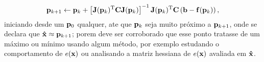 \begin{myproofT}
\begin{equation}\label{eq:proof:minfxbCfxb3}
\VECTOR{p}_{k+1} \leftarrow \VECTOR{p}_{k} +
\left[ \MATRIX{J}(\VECTOR{p}_{k})^{\transpose}\MATRIX{C} \MATRIX{J}(\VECTOR{p}_{k}) \right]^{-1}
\MATRIX{J}(\VECTOR{p}_{k})^{\transpose}\MATRIX{C} \left(\VECTOR{b}-\VECTOR{f}(\VECTOR{p}_{k})\right),
\end{equation}
iniciando desde um $\VECTOR{p}_{0}$ qualquer, ate que $\VECTOR{p}_{k}$ seja muito próximo a $\VECTOR{p}_{k+1}$,
onde se declara que $\VECTOR{\hat{x}} \approx \VECTOR{p}_{k+1}$; porem deve ser corroborado
que esse ponto tratasse de um máximo ou mínimo usando algum método, por exemplo estudando o comportamento 
de $e(\VECTOR{x})$ ou analisando a matriz hessiana de $e(\VECTOR{x})$ avaliada em $\VECTOR{\hat{x}}$.
\end{myproofT}


